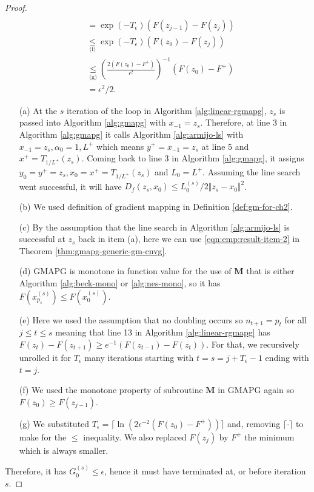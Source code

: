 \documentclass[12pt]{report}
\begin{document}
\begin{proof}
{\begin{align*}
                \\
                &= \exp(-T_\epsilon)(F(z_{j - 1}) - F(z_j)) 
                \\
                &\underset{\text{(f)}}{\le} \exp(-T_\epsilon)(F(z_{0}) - F(z_j))
                \\
                &\underset{\text{(g)}}{\le} \left(
                    \frac{2(F(z_0) - F^+)}{\epsilon^2}
                \right)^{-1}(F(z_0) - F^+) 
                \\
                &= \epsilon^2/2.
            \end{align*}
            }
            \begin{enumerate}
                \item [(a)] At the $s$ iteration of the loop in Algorithm \ref{alg:linear-rgmapg}, $z_s$ is passed into Algorithm \ref{alg:gmapg} with $x_{-1} = z_s$. Therefore, at line 3 in Algorithm \ref{alg:gmapg} it calls Algorithm \ref{alg:armijo-ls} with $x_{-1} = z_s, \alpha_0 = 1, L^+$ which means $y^+ = x_{-1} = z_s$ at line 5 and $x^+ = T_{1/L^+}(z_s)$. Coming back to line 3 in Algorithm \ref{alg:gmapg}, it assigns $y_0 = y^+ = z_s, x_0 = x^+ = T_{1/L^+}(z_s)$ and $L_0 = L^+$. Assuming the line search went successful, it will have $D_f(z_s, x_0) \le L^{(s)}_0/2 \Vert z_s - x_0\Vert^2$. 
                \item [(b)] We used definition of gradient mapping in Definition \ref{def:gm-for-ch2}. 
                \item [(c)] By the assumption that the line search in Algorithm \ref{alg:armijo-ls} is successful at $z_s$ back in item (a), here we can use \eqref{eqn:emp:result-item-2} in Theorem \ref{thm:gmapg-generic-gm-cnvg}. 
                \item [(d)] GMAPG is monotone in function value for the use of $\mathbf M$ that is either Algorithm \ref{alg:beck-mono} or \ref{alg:nes-mono}, so it has $F\left(x_{p_s}^{(s)}\right) \le F\left(x_0^{(s)}\right)$. 
                \item [(e)] Here we used the assumption that no doubling occurs so $n_{t + 1} = p_t$ for all $j \le t \le s$ meaning that line 13 in Algorithm \ref{alg:linear-rgmapg} has $F(z_t) - F(z_{t + 1}) \ge e^{-1}(F(z_{t - 1}) - F(z_t))$. For that, we recursively unrolled it for $T_\epsilon$ many iterations starting with $t = s = j + T_\epsilon - 1$ ending with $t = j$. 
                \item [(f)] We used the monotone property of subroutine $\mathbf M$ in GMAPG again so $F(z_0) \ge F(z_{j - 1})$. 
                \item [(g)] We substituted $T_\epsilon = \lceil\ln(2\epsilon^{-2}(F(z_0) - F^+))\rceil$ and, removing $\lceil\cdot\rceil$ to make for the $\le$ inequality. We also replaced $F(z_j)$ by $F^+$ the minimum which is always smaller. 
            \end{enumerate}
            Therefore, it has $G_0^{(s)} \le \epsilon$, hence it must have terminated at, or before iteration $s$. 
        \end{proof}
\end{document}
